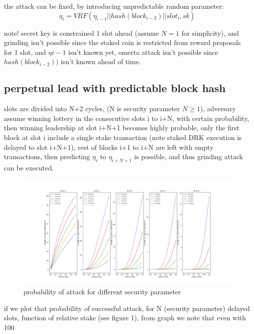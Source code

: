 \documentclass{article}
\begin{document}
the attack can be fixed, by introducing unpredictable random parameter: $$\eta_i = VRF(\eta_{i-1}||hash(block_{i-2})||slot_i, sk)$$


note! secret key is constrained 1 slot ahead (assume $N=1$ for simplicity), and grinding isn't possible since the staked coin is restricted from reward proposals for 1 slot, and $\eta{i-1}$ isn't known yet, omerta attack isn't possible since $hash(block_{i-2}))$ isn't known ahead of time.

\subsection {perpetual lead with predictable block hash}



slots are divided into N+2 cycles, (N is security parameter $N \ge 1$), adversary assume winning lottery in the consecutive slots i to i+N, with certain probability, then winning leadership at slot i+N+1 becomes highly probable, only the first block at slot i include a single stake transaction (note staked DRK execution is delayed to slot i+N+1), rest of blocks i+1 to i+N are left with empty transactions, then predicting $\eta_i$ to $\eta_{i+N+1}$ is possible, and thus grinding attack can be executed.

\begin{figure}
  \includegraphics[width=1.2\textwidth,right]{prob.png}
  \caption{probability of attack for different security parameter}
\end{figure}


if we plot that probability of successful attack, for N (security parameter) delayed slots, function of relative stake (see figure 1), from graph we  note that even with 100%
\end{document}
